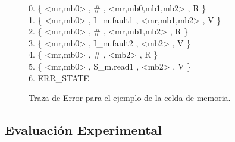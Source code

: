 \begin{figure}[t]
\centering
\begin{minipage}[t]{.47\textwidth}
\fontsize{10}{10}\selectfont\ttfamily
\begin{tabbing}
0. \{ <mr,mb0> , \# , <mr,mb0,mb1,mb2> , R \} \\ 
1. \{ <mr,mb0> , I\_m.fault1 , <mr,mb1,mb2> , V \} \\ 
2. \{ <mr,mb0> , \# , <mr,mb1,mb2> , R \} \\ 
3. \{ <mr,mb0> , I\_m.fault2 , <mb2> , V \} \\ 
4. \{ <mr,mb0> , \# , <mb2> , R \} \\ 
5. \{ <mr,mb0> , S\_m.read1 , <mb2> , V \} \\ 
6. ERR\_STATE \\ 
\end{tabbing}
\end{minipage}
\caption{Traza de Error para el ejemplo de la celda de memoria.} \label{fig:trace_mem_cell}
\end{figure}


\subsection{Evaluación Experimental} \label{sec:experimental_eval}


